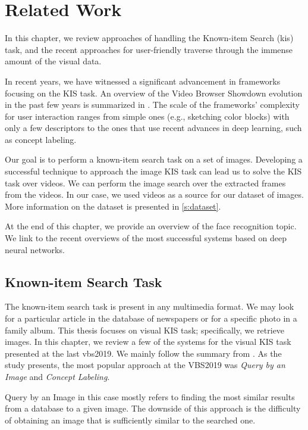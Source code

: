 \chapter{Related Work}
\label{ch:related_work}


In this chapter, we review approaches of handling the Known-item Search (\acrshort{kis}) task, and the recent approaches for user-friendly traverse through the immense amount of the visual data.

In recent years, we have witnessed a significant advancement in frameworks focusing on the KIS task. An overview of the Video Browser Showdown evolution in the past few years is summarized in \citep{lokovc2018influential}. The scale of the frameworks' complexity for user interaction ranges from simple ones (e.g., sketching color blocks) with only a few descriptors to the ones that use recent advances in deep learning, such as concept labeling.

Our goal is to perform a known-item search task on a set of images. Developing a successful technique to approach the image KIS task can lead us to solve the KIS task over videos. We can perform the image search over the extracted frames from the videos. In our case, we used videos as a source for our dataset of images. More information on the dataset is presented in \autoref{s:dataset}.

At the end of this chapter, we provide an overview of the face recognition topic. We link to the recent overviews of the most successful systems based on deep neural networks.

\section{Known-item Search Task}

The known-item search task is present in any multimedia format. We may look for a particular article in the database of newspapers or for a specific photo in a family album. This thesis focuses on visual KIS task; specifically, we retrieve images. In this chapter, we review a few of the systems for the visual KIS task presented at the last \acrshort{vbs}2019. We mainly follow the summary from \cite{rossetto2020interactive}. As the study presents, the most popular approach at the VBS2019 was \emph{Query by an Image} and \emph{Concept Labeling}. 

Query by an Image in this case mostly refers to finding the most similar results from a database to a given image. The downside of this approach is the difficulty of obtaining an image that is sufficiently similar to the searched one.

